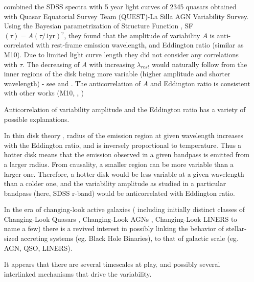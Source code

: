 \documentclass[twocolumn]{aastex62}
\begin{document}


\citep{sanchez2018} combined the SDSS spectra with 5 year light curves of 2345 quasars obtained with Quasar Equatorial Survey Team (QUEST)-La Silla AGN Variability Survey. Using the Bayesian parametrization of Structure Function \citep{schmidt2010},  SF$(\tau) = A(\tau/1 \mathrm{yr})^{\gamma} $, they found that the amplitude of variability $A$ is anti-correlated with rest-frame emission wavelength,  and Eddington ratio (similar as M10).  Due to limited light curve length they did not consider any correlations with $\tau$. The decreasing of  $A$ with increasing  $\lambda_{rest}$ would naturally follow from the inner regions of the disk being more variable (higher amplitude and  shorter wavelength) - see \citep{fausnaugh2016} and \citep{edelson2015}. The anticorrelation of $A$ and Eddington ratio is consistent with other works (M10, \citealt{simm2016}, \citealt{rakshit2017})



Anticorrelation of  variability amplitude and the Eddington ratio  has a variety of possible explanations. 

In thin disk theory \cite{shakura1973, frank2002, netzer2013}, radius of the emission region at given wavelength increases with the Eddington ratio, and is inversely proportional to temperature\cite{rakshit2017}. Thus a hotter disk means that the emission observed in a given bandpass is emitted from a larger radius. From causality, a smaller region can be more variable than a larger one. Therefore, a  hotter disk would be less variable at a given wavelength than a colder one, and  the variability amplitude as studied in a particular bandpass (here, SDSS r-band) would be anticorrelated with Eddington ratio. 

In the era of changing-look active galaxies ( including initially distinct classes of Changing-Look Quasars \citep{lamassa2015, macleod2019}, Changing-Look AGNs \citep{marchese2012, bianchi2009,risaliti2009}, Changing-Look LINERS \citep{frederick2019} to name a few) there is a revived interest in possibly linking the behavior of stellar-sized accreting systems (eg. Black Hole Binaries),  to that of galactic scale (eg. AGN, QSO, LINERS)\citep{noda2018}. 

It appears that there are several timescales at play, and possibly several interlinked mechanisms that drive the variability. 
\end{document}
